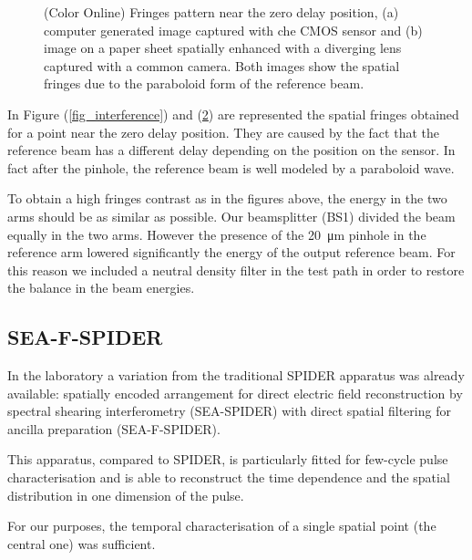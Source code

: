 \documentclass[12pt,a4paper,twoside]{article}
\begin{document}
\begin{figure}
\begin{subfigure}[b]{0.45\textwidth}
        \caption{}
        \label{photo_interference}
    \end{subfigure}
    \caption{(Color Online) Fringes pattern near the zero delay position, (a) computer generated image captured with che CMOS sensor and (b) image on a paper sheet spatially enhanced with a diverging lens captured with a common camera. Both images show the spatial fringes due to the paraboloid form of the reference beam.}
\end{figure}

In Figure (\ref{fig_interference}) and (\ref{photo_interference}) are represented the spatial fringes obtained for a point near the zero delay position.
They are caused by the fact that the reference beam has a different delay depending on the position on the sensor.
In fact after the pinhole, the reference beam is well modeled by a paraboloid wave.

To obtain a high fringes contrast as in the figures above, the energy in the two arms should be as similar as possible.
Our beamsplitter (BS1) divided the beam equally in the two arms.
However the presence of the \SI{20}{\um} pinhole in the reference arm lowered significantly the energy of the output reference beam.
For this reason we included a neutral density filter in the test path in order to restore the balance in the beam energies.

\subsection{SEA-F-SPIDER}
In the laboratory a variation from the traditional SPIDER apparatus was already available: spatially encoded arrangement for direct electric field reconstruction by spectral shearing interferometry (SEA-SPIDER) with direct spatial filtering for ancilla preparation (SEA-F-SPIDER).

This apparatus, compared to SPIDER, is particularly fitted for few-cycle pulse characterisation and is able to reconstruct the time dependence and the spatial distribution in one dimension of the pulse.

For our purposes, the temporal characterisation of a single spatial point (the central one) was sufficient.

\clearpage
\end{document}
